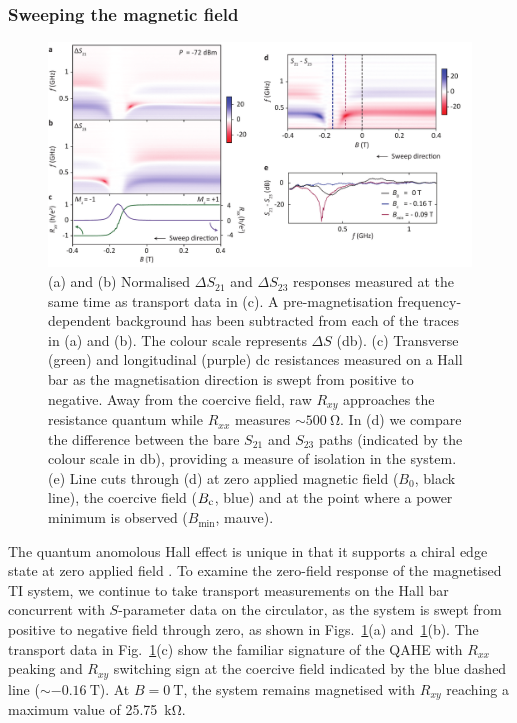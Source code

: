 \subsubsection{Sweeping the magnetic field} 
\begin{figure}
\includegraphics[scale=0.55]{Fig3_TI}
\caption[RF and DC response with magnetic field]{\label{fig:fig3_ti}(a) and (b) Normalised $\Delta S_{21}$ and $\Delta S_{23}$ responses measured at the same time as transport data in (c). A pre-magnetisation frequency-dependent background has been subtracted from each of the traces in (a) and (b). The colour scale represents $\Delta S$ (\si{\decibel}).  (c) Transverse (green) and longitudinal (purple) dc resistances measured on a Hall bar as the magnetisation direction is swept from positive to negative. Away from the coercive field, raw $R_{xy}$ approaches the resistance quantum while $R_{xx}$ measures $\sim \SI{500}{\ohm}$. In (d) we compare the difference between the bare $S_{21}$ and $S_{23}$ paths (indicated by the colour scale in \si{\decibel}), providing a measure of isolation in the system. (e) Line cuts through (d) at zero applied magnetic field ($B_0$, black line), the coercive field ($B_{\textrm c}$, blue) and at the point where a power minimum is observed ($B_{\textrm{min}}$, mauve).}
\end{figure}
The quantum anomolous Hall effect is unique in that it supports a chiral edge state at zero applied field \cite{bestwick2015precise}. To examine the zero-field response of the magnetised TI system, we continue to take transport measurements on the Hall bar concurrent with $S$-parameter data on the circulator, as the system is swept from positive to negative field through zero, as shown in Figs.~\ref{fig:fig3_ti}(a) and~\ref{fig:fig3_ti}(b). The transport data in Fig.~\ref{fig:fig3_ti}(c) show the familiar signature of the QAHE with $R_{xx}$ peaking and $R_{xy}$ switching sign at the coercive field indicated by the blue dashed line ($\sim \SI{-0.16}{\tesla}$). At $B = \SI{0}{\tesla}$, the system remains magnetised with $R_{xy}$ reaching a maximum value of \SI{25.75}{\kilo\ohm}. 

